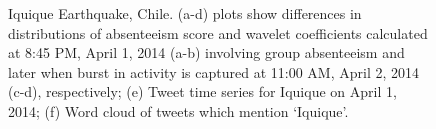 \begin{figure}[h]
{		\label{fig:burst_Chile_wavelet}
	}
	\caption{Iquique Earthquake, Chile. (a-d) plots show differences in distributions of absenteeism score and wavelet coefficients calculated at 8:45 PM, April 1, 2014 (a-b) involving group absenteeism and later when burst in activity is captured at 11:00 AM, April 2, 2014 (c-d), respectively; (e) Tweet time series for Iquique on April 1, 2014; (f) Word cloud of tweets which mention `Iquique'.}
\label{fig:case1_wavelet}
\end{figure}



